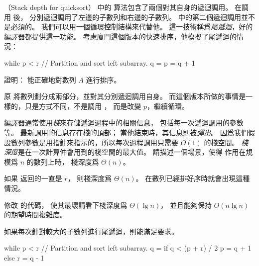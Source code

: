 \startPROBLEM
（Stack depth for quicksort）
 中的  算法包含了兩個對其自身的遞迴調用。
在調用  後，  分別遞迴調用了左邊的子數列和右邊的子數列。
  中的第二個遞迴調用並不是必須的。
我們可以用一個循環控制結構來代替他。
這一技術稱爲\emph{尾遞迴}，好的編譯器都提供這一功能。
考慮廈門這個版本的快速排序，他模擬了尾遞迴的情況：

\startCLRSCODE
while p < r
	// Partition and sort left subarray.
	q = 
	p = q + 1
\stopCLRSCODE

\startigBase[a]
\item 證明：  能正確地對數列 $A$ 進行排序。
\stopigBase

\startANSWER
原  將數列劃分成兩部分，並對其分別遞迴調用自身。
而這個版本所做的事情是一樣的，只是方式不同，不是調用 ，
而是改變 $p$，繼續循環。
\stopANSWER

編譯器通常使用\emph{棧}來存儲遞迴過程中的相關信息，
包括每一次遞迴調用的參數等。
最新調用的信息存在棧的頂部；
當他結束時，其信息則被\emph{彈出}。
因爲我們假設數列參數是用指針來指示的，所以每次過程調用只需要 $O(1)$ 的棧空間。
\emph{棧深度}是在一次計算仲會用到的棧空間的最大值。
\startigBase[a,continue]\startitem
請描述一個場景，使得  作用在規模爲 $n$ 的數列上時，
棧深度爲 $\Theta(n)$。
\stopitem\stopigBase

\startANSWER
如果  返回的一直是 $r$，
則棧深度爲 $\Theta(n)$。
在數列已經排好序時就會出現這種情況。
\stopANSWER

\startigBase[a,continue]\startitem
修改  的代碼，
使其最壞請看下棧深度爲 $\Theta(\lg{n})$，
並且能夠保持 $O(n\lg{n})$ 的期望時間複雜度。
\stopitem\stopigBase

\startANSWER
如果每次針對較大的子數列進行尾遞迴，則能滿足要求。

\startCLRSCODE
while p < r
	// Partition and sort left subarray.
	q = 
	if q < (p + r) / 2
		p = q + 1
	else
		r = q - 1
\stopCLRSCODE
\stopANSWER

\stopPROBLEM
